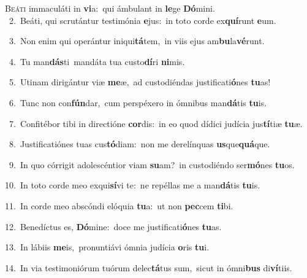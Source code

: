 \lettrine{\initial\textcolor{\initialcolor}{B}}{eáti} immaculáti in \textbf{vi}\-a:~\star qui ámbulant in \textbf{le}\-ge \textbf{Dó}\-mini.\\
{\numbfont\textcolor{\numbcolor}{~2.}}~Beáti, qui scrutántur testimónia \textbf{e}\-jus:~\star in toto corde ex\-\textbf{quí}\-runt \textbf{e}\-um.\par
{\numbfont\textcolor{\numbcolor}{~3.}}~Non enim qui operántur iniqui\-\textbf{tá}\-tem,~\star in viis ejus am\-\textbf{bu}\-la\-\textbf{vé}\-runt.\par
{\numbfont\textcolor{\numbcolor}{~4.}}~Tu man\-\textbf{dás}\-ti~\star mandáta tua custo\-\textbf{dí}\-ri \textbf{ni}\-mis.\par
{\numbfont\textcolor{\numbcolor}{~5.}}~Utinam dirigántur viæ \textbf{me}\-æ,~\star ad custodiéndas justificati\-\textbf{ó}\-nes \textbf{tu}\-as!\par
{\numbfont\textcolor{\numbcolor}{~6.}}~Tunc non con\-\textbf{fún}\-dar,~\star cum perspéxero in ómnibus man\-\textbf{dá}\-tis \textbf{tu}\-is.\par
{\numbfont\textcolor{\numbcolor}{~7.}}~Confitébor tibi in directióne \textbf{cor}\-dis:~\star in eo quod dídici judícia jus\-\textbf{tí}\-tiæ \textbf{tu}\-æ.\par
{\numbfont\textcolor{\numbcolor}{~8.}}~Justificatiónes tuas cus\-\textbf{tó}\-diam:~\star non me derelínquas \textbf{us}\-que\-\textbf{quá}\-que.\par
{\numbfont\textcolor{\numbcolor}{~9.}}~In quo córrigit adolescéntior viam \textbf{su}\-am?~\star in custodiéndo ser\-\textbf{mó}\-nes \textbf{tu}\-os.\par
{\numbfont\textcolor{\numbcolor}{10.}}~In toto corde meo exqui\-\textbf{sí}\-vi te:~\star ne repéllas me a man\-\textbf{dá}\-tis \textbf{tu}\-is.\par
{\numbfont\textcolor{\numbcolor}{11.}}~In corde meo abscóndi elóquia \textbf{tu}\-a:~\star ut non \textbf{pec}\-cem \textbf{ti}\-bi.\par
{\numbfont\textcolor{\numbcolor}{12.}}~Benedíctus es, \textbf{Dó}\-mine:~\star doce me justificati\-\textbf{ó}\-nes \textbf{tu}\-as.\par
{\numbfont\textcolor{\numbcolor}{13.}}~In lábiis \textbf{me}\-is,~\star pronuntiávi ómnia judícia \textbf{o}\-ris \textbf{tu}\-i.\par
{\numbfont\textcolor{\numbcolor}{14.}}~In via testimoniórum tuórum delec\-\textbf{tá}\-tus sum,~\star sicut in ómni\textbf{bus} di\-\textbf{ví}\-tiis.\par
